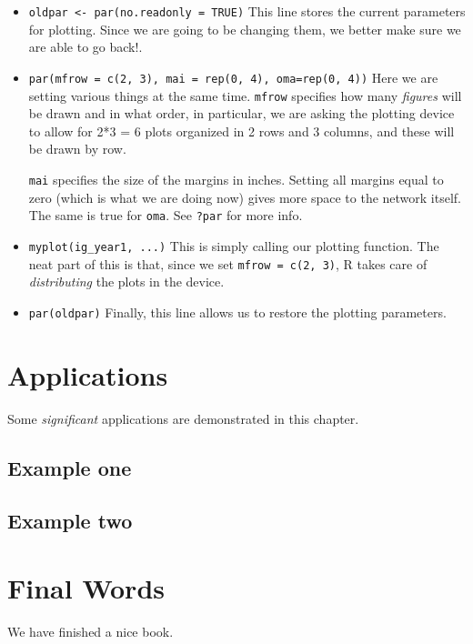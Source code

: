 \documentclass[]{book}
\theoremstyle{definition}
\theoremstyle{definition}
\theoremstyle{definition}
\theoremstyle{remark}
\begin{document}
\begin{itemize}
\item
  \texttt{oldpar\ \textless{}-\ par(no.readonly\ =\ TRUE)} This line
  stores the current parameters for plotting. Since we are going to be
  changing them, we better make sure we are able to go back!.
\item
  \texttt{par(mfrow\ =\ c(2,\ 3),\ mai\ =\ rep(0,\ 4),\ oma=rep(0,\ 4))}
  Here we are setting various things at the same time. \texttt{mfrow}
  specifies how many \emph{figures} will be drawn and in what order, in
  particular, we are asking the plotting device to allow for 2*3 = 6
  plots organized in 2 rows and 3 columns, and these will be drawn by
  row.

  \texttt{mai} specifies the size of the margins in inches. Setting all
  margins equal to zero (which is what we are doing now) gives more
  space to the network itself. The same is true for \texttt{oma}. See
  \texttt{?par} for more info.
\item
  \texttt{myplot(ig\_year1,\ ...)} This is simply calling our plotting
  function. The neat part of this is that, since we set
  \texttt{mfrow\ =\ c(2,\ 3)}, R takes care of \emph{distributing} the
  plots in the device.
\item
  \texttt{par(oldpar)} Finally, this line allows us to restore the
  plotting parameters.
\end{itemize}

\chapter{Applications}\label{applications}

Some \emph{significant} applications are demonstrated in this chapter.

\section{Example one}\label{example-one}

\section{Example two}\label{example-two}

\chapter{Final Words}\label{final-words}

We have finished a nice book.
\end{document}
